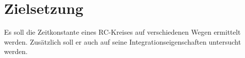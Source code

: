 \section{Zielsetzung}
\label{sec:Zielsetzung}
Es soll die Zeitkonstante eines RC-Kreises auf verschiedenen Wegen ermittelt werden.
Zusätzlich soll er auch auf seine Integrationseigenschaften untersucht werden. 
